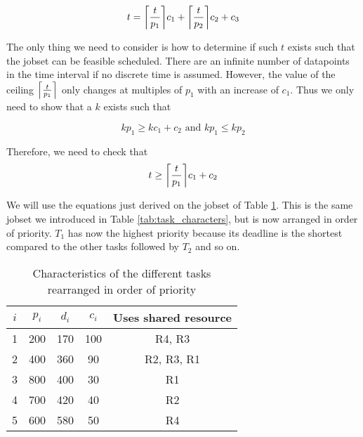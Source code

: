 \documentclass[10pt]{article}
\DeclarePairedDelimiter\ceil{\lceil}{\rceil}
\begin{document}
\begin{equation}
    t = \ceil*{\frac{t}{p_1}}c_1 + \ceil*{\frac{t}{p_2}}c_2 + c_3
\end{equation}

The only thing we need to consider is how to determine if such $t$ exists such that the jobset can be feasible scheduled.
There are an infinite number of datapoints in the time interval if no discrete time is assumed. 
However, the value of the ceiling $\ceil*{\frac{t}{p_1}}$ only changes at multiples of $p_1$ with an increase of $c_1$.
Thus we only need to show that a $k$ exists such that

\begin{equation}
    k p_1 \geq k c_1 + c_2 \text{ and } k p_1 \leq k p_2 
\end{equation}

Therefore, we need to check that
\begin{equation}
    t \geq \ceil*{\frac{t}{p_1}}c_1 + c_2
\end{equation}

We will use the equations just derived on the jobset of Table \ref{tab:task_characteristics_new}.
This is the same jobset we introduced in Table \ref{tab:task_characters}, but is now arranged in order of priority.
$T_1$ has now the highest priority because its deadline is the shortest compared to the other tasks followed by $T_2$ and so on.

\begin{table}[H]
    \centering
    \begin{tabular}{|c|c|c|c|c|}
        \hline 
        \textcolor{darkpink}{$i$} & \textcolor{darkpink}{\textit{$p_i$}} & \textcolor{darkpink}{\textit{$d_i$}} & \textcolor{darkpink}{\textit{$c_i$}} & \textcolor{darkpink}{Uses shared resource} \\
        \hline

        1 & 200 & 170 & 100 & R4, R3 \\
        \hline

        2 & 400 & 360 & 90 & R2, R3, R1 \\
        \hline

        3 & 800 & 400 & 30 & R1 \\
        \hline

        4 & 700 & 420 & 40 & R2 \\
        \hline

        5 & 600 & 580 & 50 & R4 \\
        \hline
        
    \end{tabular}
    
    \caption{Characteristics of the different tasks rearranged in order of priority}
    \label{tab:task_characteristics_new}
\end{table}
\end{document}
